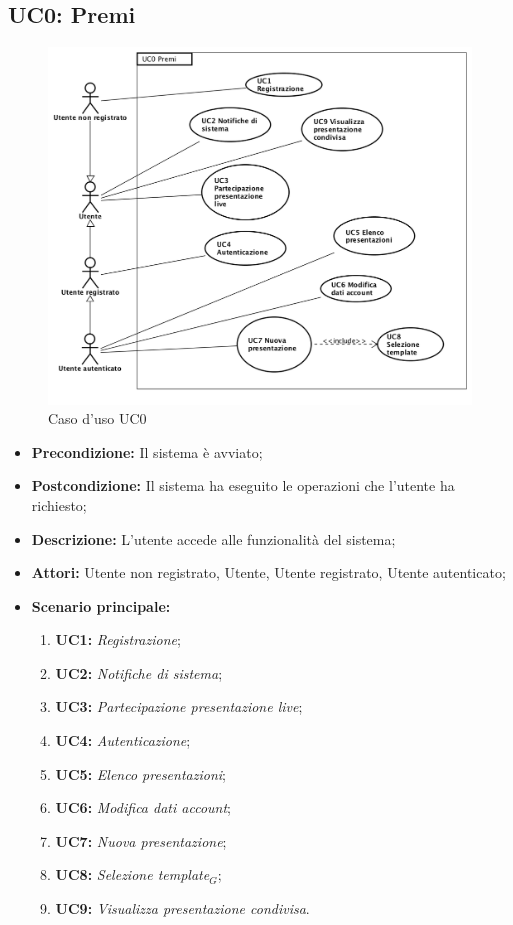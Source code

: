 \subsection{ UC0: Premi}
\begin{figure}[h]
	\begin{center}
	\includegraphics[scale=0.4]{diagram/UC0.png}
	\caption{Caso d'uso UC0}
	\end{center}
\end{figure}
\begin{itemize}
	\item \textbf{Precondizione:} Il sistema è avviato;
	\item \textbf{Postcondizione:} Il sistema ha eseguito le operazioni che l'utente ha richiesto;
	\item \textbf{Descrizione:} L'utente accede alle funzionalità del sistema;
	\item \textbf{Attori:} Utente non registrato, Utente, Utente registrato, Utente autenticato;
	\item \textbf{Scenario principale:}
	\begin{enumerate}
		\item \textbf{ UC1:} \textit{ Registrazione};
		\item \textbf{ UC2:} \textit{ Notifiche di sistema};
		\item \textbf{ UC3:} \textit{ Partecipazione presentazione live};
		\item \textbf{ UC4:} \textit{ Autenticazione};
		\item \textbf{ UC5:} \textit{ Elenco presentazioni};
		\item \textbf{ UC6:} \textit{ Modifica dati account};
		\item \textbf{ UC7:} \textit{ Nuova presentazione};
		\item \textbf{ UC8:} \textit{ Selezione template$_G$};
		\item \textbf{ UC9:} \textit{ Visualizza presentazione condivisa}.
	\end{enumerate}
\end{itemize}
\newpage
